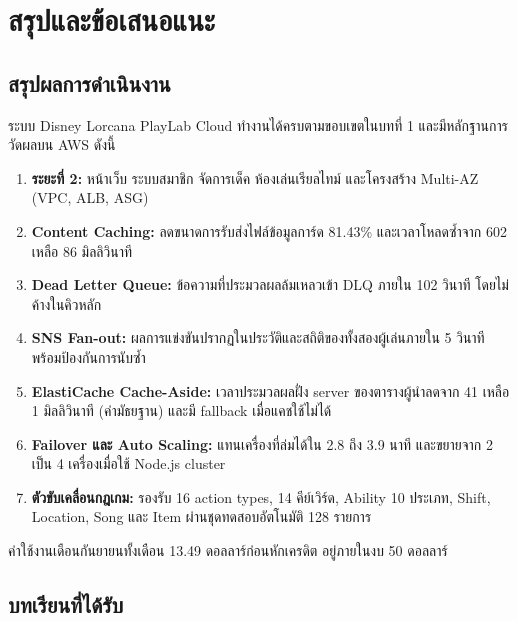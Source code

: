 \chapter{สรุปและข้อเสนอแนะ}
\label{ch:summary}

\section{สรุปผลการดำเนินงาน}

ระบบ Disney Lorcana PlayLab Cloud ทำงานได้ครบตามขอบเขตในบทที่ 1 และมีหลักฐานการวัดผลบน AWS ดังนี้

\begin{enumerate}
    \item \textbf{ระยะที่ 2:} หน้าเว็บ ระบบสมาชิก จัดการเด็ค ห้องเล่นเรียลไทม์ และโครงสร้าง Multi-AZ (VPC, ALB, ASG)
    \item \textbf{Content Caching:} ลดขนาดการรับส่งไฟล์ข้อมูลการ์ด 81.43\% และเวลาโหลดซ้ำจาก 602 เหลือ 86 มิลลิวินาที
    \item \textbf{Dead Letter Queue:} ข้อความที่ประมวลผลล้มเหลวเข้า DLQ ภายใน 102 วินาที โดยไม่ค้างในคิวหลัก
    \item \textbf{SNS Fan-out:} ผลการแข่งขันปรากฏในประวัติและสถิติของทั้งสองผู้เล่นภายใน 5 วินาที พร้อมป้องกันการนับซ้ำ
    \item \textbf{ElastiCache Cache-Aside:} เวลาประมวลผลฝั่ง server ของตารางผู้นำลดจาก 41 เหลือ 1 มิลลิวินาที (ค่ามัธยฐาน) และมี fallback เมื่อแคชใช้ไม่ได้
    \item \textbf{Failover และ Auto Scaling:} แทนเครื่องที่ล่มได้ใน 2.8 ถึง 3.9 นาที และขยายจาก 2 เป็น 4 เครื่องเมื่อใช้ Node.js cluster
    \item \textbf{ตัวขับเคลื่อนกฎเกม:} รองรับ 16 action types, 14 คีย์เวิร์ด, Ability 10 ประเภท, Shift, Location, Song และ Item ผ่านชุดทดสอบอัตโนมัติ 128 รายการ
\end{enumerate}

ค่าใช้งานเดือนกันยายนทั้งเดือน 13.49 ดอลลาร์ก่อนหักเครดิต อยู่ภายในงบ 50 ดอลลาร์

\section{บทเรียนที่ได้รับ}


